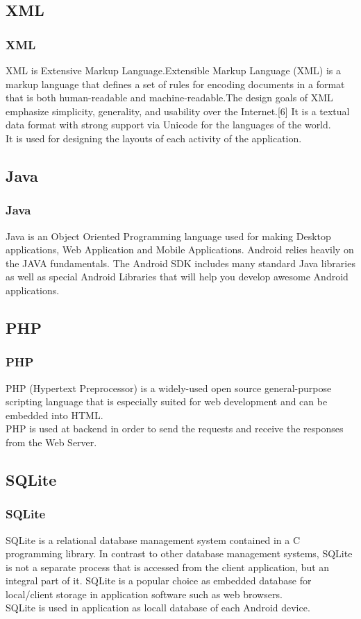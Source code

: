 \documentclass{beamer}   %
\begin{document}
\subsection{XML}
\begin{frame}
\frametitle{XML}
XML is Extensive Markup Language.Extensible Markup Language (XML) is a markup language that defines a set of rules for encoding documents in a format that is both human-readable and machine-readable.The design goals of XML emphasize simplicity, generality, and usability over the Internet.[6] It is a textual data format with strong support via Unicode for the languages of the world.\\
It is used for designing the layouts of each activity of the application.

\end{frame}

\subsection{Java}
\begin{frame}
\frametitle{Java}
Java is an Object Oriented Programming language used for making Desktop applications, Web Application and Mobile Applications.
Android relies heavily on the JAVA fundamentals. The Android SDK includes many standard Java libraries as well as special Android Libraries that will help you develop awesome Android applications.

\end{frame}

\subsection{PHP}
\begin{frame}
\frametitle{PHP}
PHP (Hypertext Preprocessor) is a widely-used open source general-purpose scripting language that is especially suited for web development and can be embedded into HTML.\\
PHP is used at backend in order to send the requests and receive the responses from the Web Server.


\end{frame}

\subsection{SQLite}
\begin{frame}
\frametitle{SQLite}
SQLite is a relational database management system contained in a C programming library. In contrast to other database management systems, SQLite is not a separate process that is accessed from the client application, but an integral part of it. SQLite is a popular choice as embedded database for local/client storage in application software such as web browsers.\\
SQLite is used in application as locall database of each Android device.

\end{frame}
\end{document}
